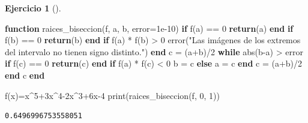 \documentclass[
  a4paper,
]{scrreport}
\newenvironment{Shaded}{\begin{snugshade}}{\end{snugshade}}
\newcommand{\ControlFlowTok}[1]{\textcolor[rgb]{0.00,0.23,0.31}{\textbf{#1}}}
\newcommand{\FloatTok}[1]{\textcolor[rgb]{0.68,0.00,0.00}{#1}}
\newcommand{\FunctionTok}[1]{\textcolor[rgb]{0.28,0.35,0.67}{#1}}
\newcommand{\KeywordTok}[1]{\textcolor[rgb]{0.00,0.23,0.31}{\textbf{#1}}}
\newcommand{\NormalTok}[1]{\textcolor[rgb]{0.00,0.23,0.31}{#1}}
\newcommand{\OperatorTok}[1]{\textcolor[rgb]{0.37,0.37,0.37}{#1}}
\newcommand{\StringTok}[1]{\textcolor[rgb]{0.13,0.47,0.30}{#1}}
\theoremstyle{definition}
\newtheorem{exercise}{Ejercicio}[chapter]
\theoremstyle{remark}
\begin{document}
\begin{exercise}[]
\begin{tcolorbox}
\begin{Shaded}
\begin{Highlighting}[]
\KeywordTok{function} \FunctionTok{raices\_biseccion}\NormalTok{(f, a, b, error}\OperatorTok{=}\FloatTok{1e{-}10}\NormalTok{)}
  \ControlFlowTok{if} \FunctionTok{f}\NormalTok{(a) }\OperatorTok{==} \FloatTok{0} \ControlFlowTok{return}\NormalTok{(a) }\ControlFlowTok{end}
  \ControlFlowTok{if} \FunctionTok{f}\NormalTok{(b) }\OperatorTok{==} \FloatTok{0} \ControlFlowTok{return}\NormalTok{(b) }\ControlFlowTok{end}
  \ControlFlowTok{if} \FunctionTok{f}\NormalTok{(a) }\OperatorTok{*} \FunctionTok{f}\NormalTok{(b) }\OperatorTok{\textgreater{}} \FloatTok{0} \FunctionTok{error}\NormalTok{(}\StringTok{"Las imágenes de los extremos del intervalo no tienen signo distinto."}\NormalTok{) }\ControlFlowTok{end}
\NormalTok{  c }\OperatorTok{=}\NormalTok{ (a}\OperatorTok{+}\NormalTok{b)}\OperatorTok{/}\FloatTok{2}
  \ControlFlowTok{while} \FunctionTok{abs}\NormalTok{(b}\OperatorTok{{-}}\NormalTok{a) }\OperatorTok{\textgreater{}}\NormalTok{ error}
    \ControlFlowTok{if} \FunctionTok{f}\NormalTok{(c) }\OperatorTok{==} \FloatTok{0} \ControlFlowTok{return}\NormalTok{(c) }\ControlFlowTok{end}
    \ControlFlowTok{if} \FunctionTok{f}\NormalTok{(a) }\OperatorTok{*} \FunctionTok{f}\NormalTok{(c) }\OperatorTok{\textless{}} \FloatTok{0}
\NormalTok{       b }\OperatorTok{=}\NormalTok{ c}
    \ControlFlowTok{else}
\NormalTok{       a }\OperatorTok{=}\NormalTok{ c}
    \ControlFlowTok{end}
\NormalTok{    c }\OperatorTok{=}\NormalTok{ (a}\OperatorTok{+}\NormalTok{b)}\OperatorTok{/}\FloatTok{2}
  \ControlFlowTok{end}
\NormalTok{  c}
\KeywordTok{end}

\FunctionTok{f}\NormalTok{(x)}\OperatorTok{=}\NormalTok{x}\OperatorTok{\^{}}\FloatTok{5}\OperatorTok{+}\FloatTok{3}\NormalTok{x}\OperatorTok{\^{}}\FloatTok{4}\OperatorTok{{-}}\FloatTok{2}\NormalTok{x}\OperatorTok{\^{}}\FloatTok{3}\OperatorTok{+}\FloatTok{6}\NormalTok{x}\OperatorTok{{-}}\FloatTok{4}
\FunctionTok{print}\NormalTok{(}\FunctionTok{raices\_biseccion}\NormalTok{(f, }\FloatTok{0}\NormalTok{, }\FloatTok{1}\NormalTok{))}
\end{Highlighting}
\end{Shaded}

\begin{verbatim}
0.6496996753558051
\end{verbatim}

\end{tcolorbox}

\end{exercise}
\end{document}
